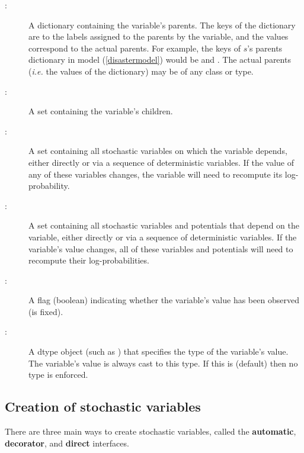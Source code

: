 \documentclass[]{jss}
\begin{document}
\begin{description}
    \item[:] A dictionary containing the variable's parents. The keys of the dictionary are to the labels assigned to the parents by the variable, and the values correspond to the actual parents. For example, the keys of $s$'s parents dictionary in model (\ref{disastermodel}) would be  and . The actual parents (\emph{i.e.} the values of the dictionary) may be of any class or type.
    \item[:] A set containing the variable's children.
    \item[:] A set containing all stochastic variables on which the variable depends, either directly or via a sequence of deterministic variables. If the value of any of these variables changes, the variable will need to recompute its log-probability.
    \item[:] A set containing all stochastic variables and potentials that depend on the variable, either directly or via a sequence of deterministic variables. If the variable's value changes, all of these variables and potentials will need to recompute their log-probabilities.
    \item[:] A flag (boolean) indicating whether the variable's value has been observed (is fixed).
    \item[:] A  dtype object (such as ) that specifies the type of the variable's value. The variable's value is always cast to this type. If this is  (default) then no type is enforced.
\end{description}

\subsection{Creation of stochastic variables}
There are three main ways to create stochastic variables, called the \textbf{automatic}, \textbf{decorator}, and \textbf{direct} interfaces.
\end{document}
